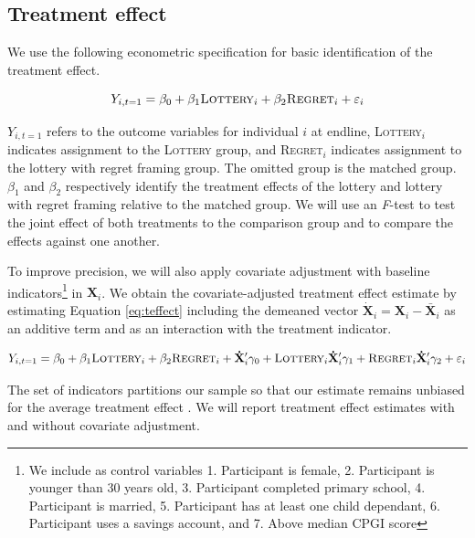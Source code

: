 \documentclass[12pt]{article}
\begin{document}
	\subsection{Treatment effect}

		We use the following econometric specification for basic identification of the treatment effect.

		\begin{equation} \label{eq:teffect}
			Y_{i,t=1} = \beta_{0} + \beta_{1}\text{\textsc{Lottery}}_{i} + \beta_{2}\text{\textsc{Regret}}_{i} + \varepsilon_{i}
		\end{equation}

		$Y_{i,t=1}$ refers to the outcome variables for individual $i$ at endline, \textsc{Lottery}$_i$ indicates assignment to the \textsc{Lottery} group, and \textsc{Regret}$_i$ indicates assignment to the lottery with regret framing group. The omitted group is the matched group. $\beta_{1}$ and $\beta_{2}$ respectively identify the treatment effects of the lottery and lottery with regret framing relative to the matched group. We will use an \emph{F}-test to test the joint effect of both treatments to the comparison group and to compare the effects against one another.

		To improve precision, we will also apply covariate adjustment with baseline indicators\footnote{We include as control variables 1. Participant is female, 2. Participant is younger than 30 years old, 3. Participant completed primary school, 4. Participant is married, 5. Participant has at least one child dependant, 6. Participant uses a savings account, and 7. Above median CPGI score} in $\mathbf{X}_i$. We obtain the covariate-adjusted treatment effect estimate by estimating Equation \ref{eq:teffect} including the demeaned vector $\mathbf{\dot X}_{i} = \mathbf{X}_{i} - \mathbf{\bar X}_{i}$ as an additive term and as an interaction with the treatment indicator.

		\begin{equation} \label{eq:controls}
			Y_{i,t=1} = \beta_{0} + \beta_{1}\text{\textsc{Lottery}}_{i} + \beta_{2}\text{\textsc{Regret}}_{i} + \mathbf{\dot X}'_i \gamma_{0} + \text{\textsc{Lottery}}_{i} \mathbf{\dot X}'_i \gamma_{1} + \text{\textsc{Regret}}_{i} \mathbf{\dot X}'_i \gamma_{2} + \varepsilon_{i}
		\end{equation}

		The set of indicators partitions our sample so that our estimate remains unbiased for the average treatment effect . We will report treatment effect estimates with and without covariate adjustment.
\end{document}
